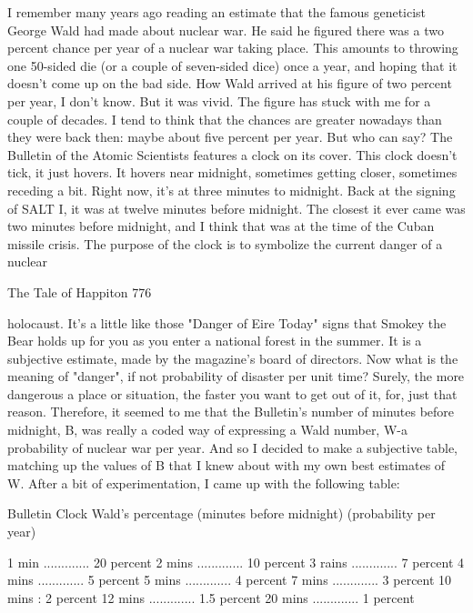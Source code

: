         I remember many years ago reading an estimate that the famous geneticist
George Wald had made about nuclear war. He said he figured there was a two percent
chance per year of a nuclear war taking place. This amounts to throwing one 50-sided
die (or a couple of seven-sided dice) once a year, and hoping that it doesn't come up
on the bad side. How Wald arrived at his figure of two percent per year, I don't know.
But it was vivid. The figure has stuck with me for a couple of decades. I tend to think
that the chances are greater nowadays than they were back then: maybe about five
percent per year. But who can say?
        The Bulletin of the Atomic Scientists features a clock on its cover. This clock
doesn't tick, it just hovers. It hovers near midnight, sometimes getting closer,
sometimes receding a bit. Right now, it's at three minutes to midnight. Back at the
signing of SALT I, it was at twelve minutes before midnight. The closest it ever came
was two minutes before midnight, and I think that was at the time of the Cuban
missile crisis.
        The purpose of the clock is to symbolize the current danger of a nuclear




The Tale of Happiton                                                                 776

holocaust. It's a little like those "Danger of Eire Today" signs that Smokey the Bear
holds up for you as you enter a national forest in the summer. It is a subjective
estimate, made by the magazine's board of directors. Now what is the meaning of
"danger", if not probability of disaster per unit time? Surely, the more dangerous a
place or situation, the faster you want to get out of it, for, just that reason. Therefore,
it seemed to me that the Bulletin's number of minutes before midnight, B, was really a
coded way of expressing a Wald number, W-a probability of nuclear war per year.
And so I decided to make a subjective table, matching up the values of B that I knew
about with my own best estimates of W. After a bit of experimentation, I came up
with the following table:

       Bulletin Clock                  Wald's percentage
       (minutes before midnight)       (probability per year)

               1 min .............     20 percent
               2 mins .............    10 percent
               3 rains .............   7 percent
               4 mins .............    5 percent
               5 mins .............    4 percent
               7 mins .............    3 percent
               10 mins             :   2 percent
               12 mins .............   1.5 percent
               20 mins .............   1 percent


